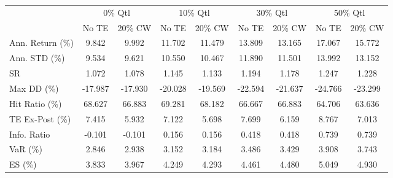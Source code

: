 \begin{tabular}{lcccccccc}
\toprule
{} & \multicolumn{2}{c}{0\% Qtl} & \multicolumn{2}{c}{10\% Qtl} & \multicolumn{2}{c}{30\% Qtl} & \multicolumn{2}{c}{50\% Qtl} \\
{} &   No TE &  20\% CW &   No TE &  20\% CW &   No TE &  20\% CW &   No TE &  20\% CW \\
\midrule
Ann. Return (\%) &   9.842 &   9.992 &  11.702 &  11.479 &  13.809 &  13.165 &  17.067 &  15.772 \\
Ann. STD (\%)    &   9.534 &   9.621 &  10.550 &  10.467 &  11.890 &  11.501 &  13.992 &  13.152 \\
SR              &   1.072 &   1.078 &   1.145 &   1.133 &   1.194 &   1.178 &   1.247 &   1.228 \\
Max DD (\%)      & -17.987 & -17.930 & -20.028 & -19.569 & -22.594 & -21.637 & -24.766 & -23.299 \\
Hit Ratio (\%)   &  68.627 &  66.883 &  69.281 &  68.182 &  66.667 &  66.883 &  64.706 &  63.636 \\
TE Ex-Post (\%)  &   7.415 &   5.932 &   7.122 &   5.698 &   7.699 &   6.159 &   8.767 &   7.013 \\
Info. Ratio     &  -0.101 &  -0.101 &   0.156 &   0.156 &   0.418 &   0.418 &   0.739 &   0.739 \\
VaR (\%)         &   2.846 &   2.938 &   3.152 &   3.184 &   3.486 &   3.429 &   3.908 &   3.743 \\
ES (\%)          &   3.833 &   3.967 &   4.249 &   4.293 &   4.461 &   4.480 &   5.049 &   4.930 \\
\bottomrule
\end{tabular}
